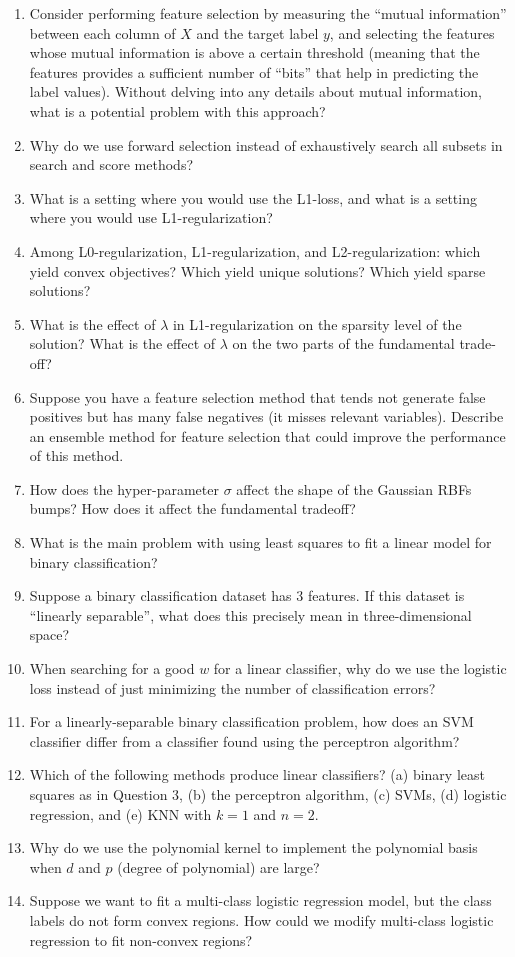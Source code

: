 \documentclass{article}
\def\enum#1{\begin{enumerate}#1\end{enumerate}}
\begin{document}
\enum{
\item Consider performing feature selection by measuring the ``mutual information'' between each column of $X$ and the target label $y$, and selecting the features whose mutual information is above a certain threshold (meaning that the features provides a sufficient number of ``bits'' that help in predicting the label values). Without delving into any details about mutual information, what is a potential problem with this approach?
\item Why do we use forward selection instead of exhaustively search all subsets in search and score methods?
\item What is a setting where you would use the L1-loss, and what is a setting where you would use L1-regularization?
\item Among L0-regularization, L1-regularization, and L2-regularization: which yield convex objectives? Which yield unique solutions? Which yield sparse solutions?
\item What is the effect of $\lambda$ in L1-regularization on the sparsity level of the solution? What is the effect of $\lambda$ on the two parts of the fundamental trade-off?
\item Suppose you have a feature selection method that tends not generate false positives but has many false negatives (it misses relevant variables). Describe an ensemble method for feature selection that could improve the performance of this method.
\item How does the hyper-parameter $\sigma$ affect the shape of the Gaussian RBFs bumps? How does it affect the fundamental tradeoff?
\item What is the main problem with using least squares to fit a linear model for binary classification?
\item Suppose a binary classification dataset has 3 features. If this dataset is ``linearly separable'', what does this precisely mean in three-dimensional space?
\item When searching for a good $w$ for a linear classifier, why do we use the logistic loss instead of just minimizing the number of classification errors?
\item For a linearly-separable binary classification problem, how does an SVM classifier differ from a classifier found using the perceptron algorithm?
\item Which of the following methods produce linear classifiers? (a) binary least squares as in Question 3, (b) the perceptron algorithm, (c) SVMs, (d) logistic regression, and (e) KNN with $k=1$ and $n=2$.
\item Why do we use the polynomial kernel to implement the polynomial basis when $d$ and $p$ (degree of polynomial) are large?
\item Suppose we want to fit a multi-class logistic regression model, but the class labels do not form convex regions. How could we modify multi-class logistic regression to fit non-convex regions?
}
\end{document}
